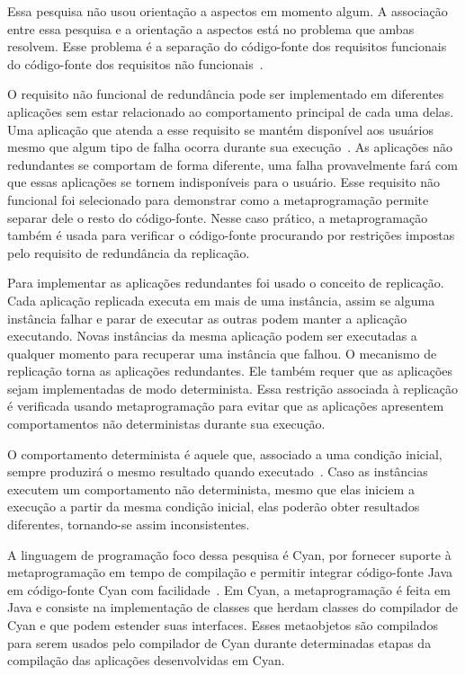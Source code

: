 Essa pesquisa não usou orientação a aspectos em momento algum. A associação entre essa pesquisa e a orientação a aspectos está no problema que ambas resolvem. Esse problema é a separação do código-fonte dos requisitos funcionais do código-fonte dos requisitos não funcionais~\cite{glinz2007non}.

O requisito não funcional de redundância pode ser implementado em diferentes aplicações sem estar relacionado ao comportamento principal de cada uma delas. Uma aplicação que atenda a esse requisito se mantém disponível aos usuários mesmo que algum tipo de falha ocorra durante sua execução~\cite{cachin2011introduction}. As aplicações não redundantes se comportam de forma diferente, uma falha provavelmente fará com que essas aplicações se tornem indisponíveis para o usuário. Esse requisito não funcional foi selecionado para demonstrar como a metaprogramação permite separar dele o resto do código-fonte. Nesse caso prático, a metaprogramação também é usada para verificar o código-fonte procurando por restrições impostas pelo requisito de redundância da replicação.

Para implementar as aplicações redundantes foi usado o conceito de replicação. Cada aplicação replicada executa em mais de uma instância, assim se alguma instância falhar e parar de executar as outras podem manter a aplicação executando. Novas instâncias da mesma aplicação podem ser executadas a qualquer momento para recuperar uma instância que falhou. O mecanismo de replicação torna as aplicações redundantes. Ele também requer que as aplicações sejam implementadas de modo determinista. Essa restrição associada à replicação é verificada usando metaprogramação para evitar que as aplicações apresentem comportamentos não deterministas durante sua execução.

O comportamento determinista é aquele que, associado a uma condição inicial, sempre produzirá o mesmo resultado quando executado~\cite{wiesmann2000understanding}. Caso as instâncias executem um comportamento não determinista, mesmo que elas iniciem a execução a partir da mesma condição inicial, elas poderão obter resultados diferentes, tornando-se assim inconsistentes.

A linguagem de programação foco dessa pesquisa é Cyan, por fornecer suporte à metaprogramação em tempo de compilação e permitir integrar código-fonte Java em código-fonte Cyan com facilidade~\cite{guimaraes2013cyan}. Em Cyan, a metaprogramação é feita em Java e consiste na implementação de classes que herdam classes do compilador de Cyan e que podem estender suas interfaces. Esses metaobjetos são compilados para serem usados pelo compilador de Cyan durante determinadas etapas da compilação das aplicações desenvolvidas em Cyan.

